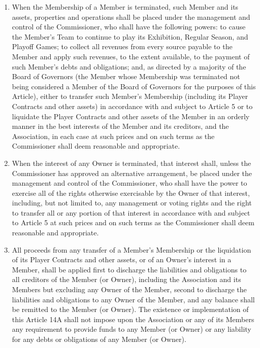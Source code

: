 \documentclass[]{book}
\providecommand{\tightlist}{%
  \setlength{\itemsep}{0pt}\setlength{\parskip}{0pt}}
\theoremstyle{definition}
\theoremstyle{definition}
\theoremstyle{definition}
\theoremstyle{remark}
\begin{document}
\begin{enumerate}
\def\labelenumi{(\alph{enumi})}
\tightlist
\item
  When the Membership of a Member is terminated, such Member and its
  assets, properties and operations shall be placed under the management
  and control of the Commissioner, who shall have the following powers:
  to cause the Member's Team to continue to play its Exhibition, Regular
  Season, and Playoff Games; to collect all revenues from every source
  payable to the Member and apply such revenues, to the extent
  available, to the payment of such Member's debts and obligations; and,
  as directed by a majority of the Board of Governors (the Member whose
  Membership was terminated not being considered a Member of the Board
  of Governors for the purposes of this Article), either to transfer
  such Member's Membership (including its Player Contracts and other
  assets) in accordance with and subject to Article 5 or to liquidate
  the Player Contracts and other assets of the Member in an orderly
  manner in the best interests of the Member and its creditors, and the
  Association, in each case at such prices and on such terms as the
  Commissioner shall deem reasonable and appropriate.
\item
  When the interest of any Owner is terminated, that interest shall,
  unless the Commissioner has approved an alternative arrangement, be
  placed under the management and control of the Commissioner, who shall
  have the power to exercise all of the rights otherwise exercisable by
  the Owner of that interest, including, but not limited to, any
  management or voting rights and the right to transfer all or any
  portion of that interest in accordance with and subject to Article 5
  at such prices and on such terms as the Commissioner shall deem
  reasonable and appropriate.
\item
  All proceeds from any transfer of a Member's Membership or the
  liquidation of its Player Contracts and other assets, or of an Owner's
  interest in a Member, shall be applied first to discharge the
  liabilities and obligations to all creditors of the Member (or Owner),
  including the Association and its Members but excluding any Owner of
  the Member, second to discharge the liabilities and obligations to any
  Owner of the Member, and any balance shall be remitted to the Member
  (or Owner). The existence or implementation of this Article 14A shall
  not impose upon the Association or any of its Members any requirement
  to provide funds to any Member (or Owner) or any liability for any
  debts or obligations of any Member (or Owner).
\end{enumerate}
\end{document}
